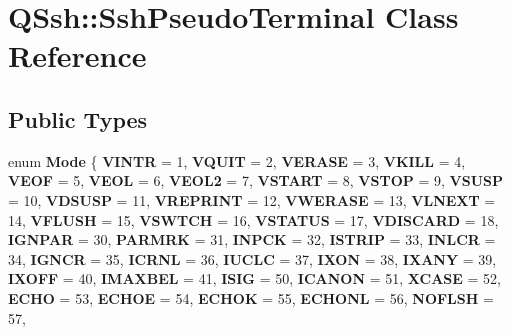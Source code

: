 \hypertarget{class_q_ssh_1_1_ssh_pseudo_terminal}{}\section{Q\+Ssh\+:\+:Ssh\+Pseudo\+Terminal Class Reference}
\label{class_q_ssh_1_1_ssh_pseudo_terminal}
\subsection*{Public Types}
\begin{DoxyCompactItemize}
\item 
\mbox{\label{class_q_ssh_1_1_ssh_pseudo_terminal_ae9b18a07c4c5ff1274e89d41a1fbcbd3}} 
enum {\bfseries Mode} \{ \newline
{\bfseries V\+I\+N\+TR} = 1, 
{\bfseries V\+Q\+U\+IT} = 2, 
{\bfseries V\+E\+R\+A\+SE} = 3, 
{\bfseries V\+K\+I\+LL} = 4, 
\newline
{\bfseries V\+E\+OF} = 5, 
{\bfseries V\+E\+OL} = 6, 
{\bfseries V\+E\+O\+L2} = 7, 
{\bfseries V\+S\+T\+A\+RT} = 8, 
\newline
{\bfseries V\+S\+T\+OP} = 9, 
{\bfseries V\+S\+U\+SP} = 10, 
{\bfseries V\+D\+S\+U\+SP} = 11, 
{\bfseries V\+R\+E\+P\+R\+I\+NT} = 12, 
\newline
{\bfseries V\+W\+E\+R\+A\+SE} = 13, 
{\bfseries V\+L\+N\+E\+XT} = 14, 
{\bfseries V\+F\+L\+U\+SH} = 15, 
{\bfseries V\+S\+W\+T\+CH} = 16, 
\newline
{\bfseries V\+S\+T\+A\+T\+US} = 17, 
{\bfseries V\+D\+I\+S\+C\+A\+RD} = 18, 
{\bfseries I\+G\+N\+P\+AR} = 30, 
{\bfseries P\+A\+R\+M\+RK} = 31, 
\newline
{\bfseries I\+N\+P\+CK} = 32, 
{\bfseries I\+S\+T\+R\+IP} = 33, 
{\bfseries I\+N\+L\+CR} = 34, 
{\bfseries I\+G\+N\+CR} = 35, 
\newline
{\bfseries I\+C\+R\+NL} = 36, 
{\bfseries I\+U\+C\+LC} = 37, 
{\bfseries I\+X\+ON} = 38, 
{\bfseries I\+X\+A\+NY} = 39, 
\newline
{\bfseries I\+X\+O\+FF} = 40, 
{\bfseries I\+M\+A\+X\+B\+EL} = 41, 
{\bfseries I\+S\+IG} = 50, 
{\bfseries I\+C\+A\+N\+ON} = 51, 
\newline
{\bfseries X\+C\+A\+SE} = 52, 
{\bfseries E\+C\+HO} = 53, 
{\bfseries E\+C\+H\+OE} = 54, 
{\bfseries E\+C\+H\+OK} = 55, 
\newline
{\bfseries E\+C\+H\+O\+NL} = 56, 
{\bfseries N\+O\+F\+L\+SH} = 57, 

\end{DoxyCompactItemize}
